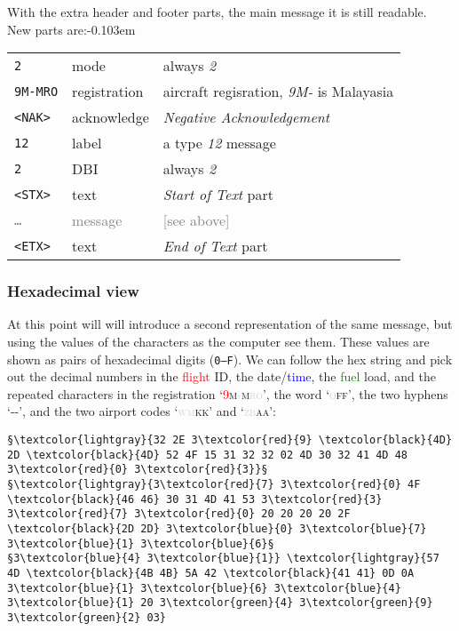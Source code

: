 \documentclass[tikz,a4paper,12pt]{article}
\begin{document}
{With the extra header and footer parts, the main message it is still readable. New parts are:\unskip\parfillskip-0.103em \par}

\begin{center}
\begin{tabular}{p{1.5cm}p{2cm}p{8cm}}
\hfill\texttt{2}&mode&always \emph{2}\\
\hfill\texttt{9M-MRO}&registration&aircraft regisration, \emph{9M-} is Malayasia\\
\hfill\texttt{<NAK>}&acknowledge&\emph{Negative Acknowledgement}\\
\hfill\texttt{12}&label&a type \emph{12} message\\
\hfill\texttt{2}&DBI&always \emph{2}\\
\hfill\texttt{<STX>}&text&\emph{Start of Text} part\\
\hline
\hfill\textcolor{gray}{\texttt{\ldots}}&\textcolor{gray}{message}&\textcolor{gray}{[see above]}\\
\hline
\hfill\texttt{<ETX>}&text&\emph{End of Text} part\\
\end{tabular}
\end{center}

\subsubsection*{Hexadecimal view}
At this point will will introduce a second representation of the same
message, but using the values of the characters as the computer see
them.  These values are shown as pairs of hexadecimal digits (\texttt{0--F}).  We can follow the hex string and pick out the decimal numbers in the
\textcolor{red}{flight} ID, the date/\textcolor{blue}{time}, the
\textcolor{green}{fuel} load, and the repeated characters in the
registration
\textsc{`\textcolor{red}{9}m\textcolor{lightgray}{-}m\textcolor{lightgray}{ro}'},
the word \textsc{`\textcolor{lightgray}{o}ff'}, the two hyphens `-{}-', and
the two airport codes \textsc{`\textcolor{lightgray}{wm}kk'} and
\textsc{`\textcolor{lightgray}{zb}aa'}:

\begin{lstlisting}[language=ACARS]
         §\textcolor{lightgray}{32 2E 3\textcolor{red}{9} \textcolor{black}{4D} 2D \textcolor{black}{4D} 52 4F 15 31 32 32 02 4D 30 32 41 4D 48 3\textcolor{red}{0} 3\textcolor{red}{3}}§
§\textcolor{lightgray}{3\textcolor{red}{7} 3\textcolor{red}{0} 4F \textcolor{black}{46 46} 30 31 4D 41 53 3\textcolor{red}{3} 3\textcolor{red}{7} 3\textcolor{red}{0} 20 20 20 20 2F \textcolor{black}{2D 2D} 3\textcolor{blue}{0} 3\textcolor{blue}{7} 3\textcolor{blue}{1} 3\textcolor{blue}{6}§
§3\textcolor{blue}{4} 3\textcolor{blue}{1}} \textcolor{lightgray}{57 4D \textcolor{black}{4B 4B} 5A 42 \textcolor{black}{41 41} 0D 0A 3\textcolor{blue}{1} 3\textcolor{blue}{6} 3\textcolor{blue}{4} 3\textcolor{blue}{1} 20 3\textcolor{green}{4} 3\textcolor{green}{9} 3\textcolor{green}{2} 03}
\end{lstlisting}
\end{document}
